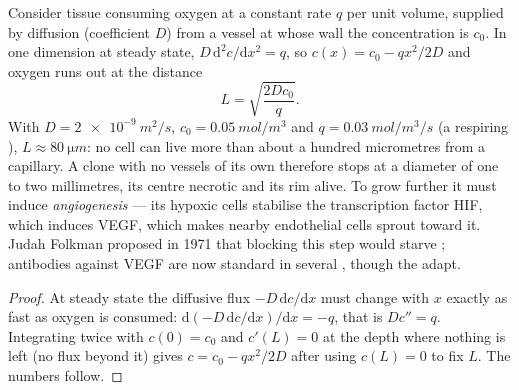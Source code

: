 \begin{proposition}\label{prop:b3:cancer-biology:oxygen}
Consider tissue consuming oxygen at a constant rate $q$ per unit volume,
supplied by diffusion (coefficient $D$) from a vessel at whose wall the
concentration is $c_{0}$. In one dimension at steady state, $D\,
\mathrm{d}^{2}c/\mathrm{d}x^{2} = q$, so $c(x) = c_{0} - qx^{2}/2D$ and
oxygen runs out at the distance
\[
L = \sqrt{\frac{2Dc_{0}}{q}} .
\]
With $D = \qty{2e-9}{m^2/s}$, $c_{0} = \qty{0.05}{mol/m^3}$ and $q =
\qty{0.03}{mol/m^3/s}$ (a respiring ), $L \approx \qty{80}{\micro
m}$: no cell can live more than about a hundred micrometres from a
capillary. A clone with no vessels of its own therefore stops at a
diameter of one to two millimetres, its centre necrotic and its rim
alive. To grow further it must induce \emph{angiogenesis} --- its
hypoxic cells stabilise the transcription factor HIF, which induces
VEGF, which makes nearby endothelial cells sprout toward it. Judah
Folkman proposed in 1971 that blocking this step would starve ;
antibodies against VEGF are now standard in several , though the
 adapt.
\end{proposition}
\begin{proof}
At steady state the diffusive flux $-D\,\mathrm{d}c/\mathrm{d}x$ must
change with $x$ exactly as fast as oxygen is consumed: $\mathrm{d}(-D\,
\mathrm{d}c/\mathrm{d}x)/\mathrm{d}x = -q$, that is $D c'' = q$.
Integrating twice with $c(0) = c_{0}$ and $c'(L) = 0$ at the depth
where nothing is left (no flux beyond it) gives $c = c_{0} - qx^{2}/2D$
after using $c(L) = 0$ to fix $L$. The numbers follow.
\end{proof}

